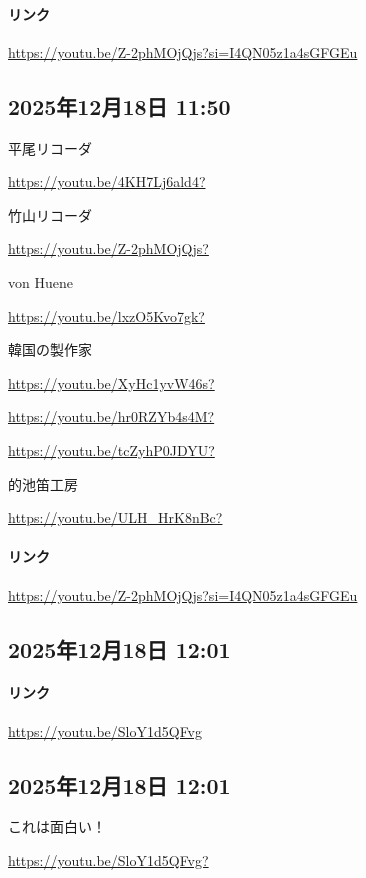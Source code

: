 \paragraph{リンク}
\url{https://youtu.be/Z-2phMOjQjs?si=I4QN05z1a4sGFGEu}

\subsection*{2025年12月18日 11:50}

平尾リコーダ

\url{https://youtu.be/4KH7Lj6ald4?}

竹山リコーダ

\url{https://youtu.be/Z-2phMOjQjs?}

von Huene

\url{https://youtu.be/lxzO5Kvo7gk?}

韓国の製作家

\url{https://youtu.be/XyHc1yvW46s?}

\url{https://youtu.be/hr0RZYb4s4M?}

\url{https://youtu.be/tcZyhP0JDYU?}

的池笛工房

\url{https://youtu.be/ULH_HrK8nBc?}

\paragraph{リンク}
\url{https://youtu.be/Z-2phMOjQjs?si=I4QN05z1a4sGFGEu}

\subsection*{2025年12月18日 12:01}

\paragraph{リンク}
\url{https://youtu.be/SloY1d5QFvg}

\subsection*{2025年12月18日 12:01}

これは面白い！

\url{https://youtu.be/SloY1d5QFvg?}

